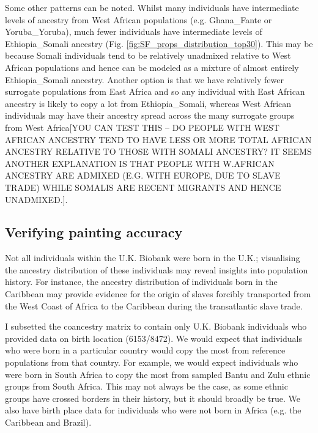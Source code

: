 Some other patterns can be noted. Whilst many individuals have intermediate levels of ancestry from West African populations (e.g. Ghana\_Fante or Yoruba\_Yoruba), much fewer individuals have intermediate levels of Ethiopia\_Somali ancestry (Fig. \ref{fig:SF_props_distribution_top30}). This may be because Somali individuals tend to be relatively unadmixed relative to West African populations and hence can be modeled as a mixture of almost entirely Ethiopia\_Somali ancestry. Another option is that we have relatively fewer surrogate populations from East Africa and so any individual with East African ancestry is likely to copy a lot from Ethiopia\_Somali, whereas West African individuals may have their ancestry spread across the many surrogate groups from West Africa{\color{red}[YOU CAN TEST THIS -- DO PEOPLE WITH WEST AFRICAN ANCESTRY TEND TO HAVE LESS OR MORE TOTAL AFRICAN ANCESTRY RELATIVE TO THOSE WITH SOMALI ANCESTRY? IT SEEMS ANOTHER EXPLANATION IS THAT PEOPLE WITH W.AFRICAN ANCESTRY ARE ADMIXED (E.G. WITH EUROPE, DUE TO SLAVE TRADE) WHILE SOMALIS ARE RECENT MIGRANTS AND HENCE UNADMIXED.]}. 
%

\subsection{Verifying painting accuracy} 
 

Not all individuals within the U.K. Biobank were born in the U.K.; visualising the ancestry distribution of these individuals may reveal insights into population history. For instance, the ancestry distribution of individuals born in the Caribbean may provide evidence for the origin of slaves forcibly transported from the West Coast of Africa to the Caribbean during the transatlantic slave trade. 

I subsetted the coancestry matrix to contain only U.K. Biobank individuals who provided data on birth location (6153/8472). We would expect that individuals who were born in a particular country would copy the most from reference populations from that country. For example, we would expect individuals who were born in South Africa to copy the most from sampled Bantu and Zulu ethnic groups from South Africa. This may not always be the case, as some ethnic groups have crossed borders in their history, but it should broadly be true. We also have birth place data for individuals who were not born in Africa (e.g. the Caribbean and Brazil). 

